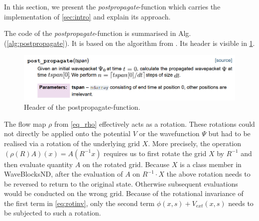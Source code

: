 \documentclass[11pt, a4paper, oneside]{article}
\begin{document}
In this section, we present the \emph{postpropagate}-function which carries the implementation of \cref{sec:intro} and explain its approach. \newline

The code of the \emph{postpropagate}-function is summarised in Alg. (\ref{alg:postpropagate}). It is based on the algorithm from . Its header is visible in \cref{fig:pp}.
\begin{figure}[ht]
  \centering
  \includegraphics[width = 0.9 \textwidth]{graphics/doc_postpropagate.PNG}
  \caption{Header of the postpropagate-function.}
  \label{fig:pp}
\end{figure}

The flow map $\rho$ from \cref{eq_rho} effectively acts as a rotation. These rotations could not directly be applied onto the potential $V$ or the wavefunction $\Psi$ but had to be realised via a rotation of the underlying grid $X$. More precisely, the operation $(\rho(R)A)(x) = A(R^{-1}x)$ requires us to first rotate the grid $X$ by $R^{-1}$ and then evaluate quantity $A$ on the rotated grid. Because $X$ is a class member in WaveBlocksND, after the evaluation of $A$ on $R^{-1}\cdot X$ the above rotation needs to be reversed to return to the original state. Otherwise subsequent evaluations would be conducted on the wrong grid.\newline
Because of the rotational invariance of the first term in \cref{eq:rotinv}, only the second term $\phi(x,s) + V_{ext}(x,s)$ needs to be subjected to such a rotation. \newline
\end{document}
